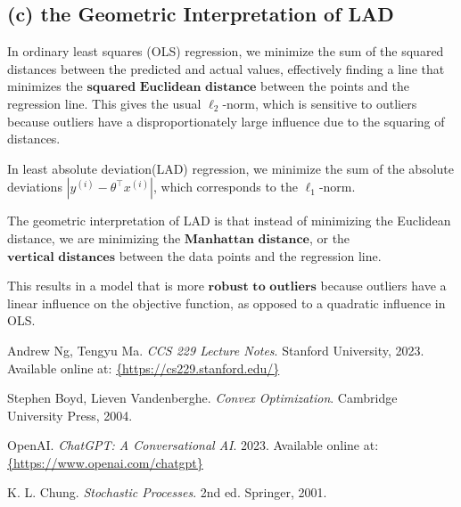 \documentclass[12pt]{article}
\begin{document}
\subsection*{(c) the Geometric Interpretation of LAD}

In ordinary least squares (OLS) regression, we minimize the sum of the squared distances between the predicted and actual values, effectively finding a line that minimizes the \(\textbf{squared Euclidean distance}\) between the points and the regression line. This gives the usual \( \ell_2 \)-norm, which is sensitive to outliers because outliers have a disproportionately large influence due to the squaring of distances.

In least absolute deviation(LAD) regression, we minimize the sum of the absolute deviations \( |y^{(i)} - \theta^\top x^{(i)}| \), which corresponds to the \( \ell_1 \)-norm.

The geometric interpretation of LAD is that instead of minimizing the Euclidean distance, we are minimizing the \(\textbf{Manhattan distance}\), or the \(\textbf{vertical distances}\) between the data points and the regression line. 

This results in a model that is more \(\textbf{robust to outliers}\) because outliers have a linear influence on the objective function, as opposed to a quadratic influence in OLS.


\newpage
\begin{thebibliography}{99}

    Andrew Ng, Tengyu Ma. \textit{CCS 229 Lecture Notes}. Stanford University, 2023. Available online at: \url{{https://cs229.stanford.edu/}}
    
    Stephen Boyd, Lieven Vandenberghe. \textit{Convex Optimization}. Cambridge University Press, 2004.
    
    OpenAI. \textit{ChatGPT: A Conversational AI}. 2023. Available online at: \url{{https://www.openai.com/chatgpt}}
    
    K. L. Chung. \textit{Stochastic Processes}. 2nd ed. Springer, 2001.

    \end{thebibliography}
    
\end{document}
